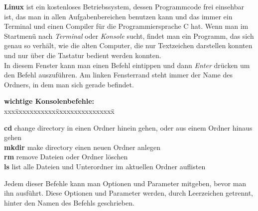 \documentclass[c_worksheet.tex]{subfiles}
\begin{document}
\textbf{Linux} ist ein kostenloses Betriebssystem, dessen Programmcode frei einsehbar ist, das man in allen Aufgabenbereichen benutzen kann und das immer ein Terminal und einen Compiler für die Programmiersprache C hat. Wenn man im Startmenü nach \textit{Terminal} oder \textit{Konsole} sucht, findet man ein Programm, das sich genau so verhält, wie die alten Computer, die nur Textzeichen darstellen konnten und nur über die Tastatur bedient werden konnten.\\
In diesem Fenster kann man einen Befehl eintippen und dann \textit{Enter} drücken um den Befehl auszuführen. Am linken Fensterrand steht immer der Name des Ordners, in dem man sich gerade befindet.\\

\begin{tabbing}
\textbf{wichtige Konsolenbefehle:} \\
xxx\=xxxxxxxxxxx\=xxxxxxxxxxxxxxxx\= \kill

\>\textbf{cd} \>change directory \>in einen Ordner hinein gehen, oder aus einem Ordner hinaus gehen \\
\>\textbf{mkdir} \>make directory \>einen neuen Ordner anlegen \\
\>\textbf{rm} \>remove \>Dateien oder Ordner löschen \\
\>\textbf{ls} \>list \>alle Dateien und Unterordner im aktuellen Ordner auflisten \\
\end{tabbing}
Jedem dieser Befehle kann man Optionen und Parameter mitgeben, bevor man ihn ausführt. Diese Optionen und Parameter werden, durch Leerzeichen getrennt, hinter den Namen des Befehls geschrieben.\\
\end{document}
